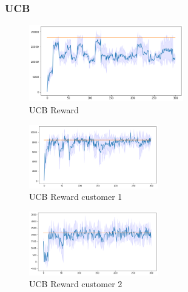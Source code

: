 \subsubsection{UCB}
\begin{figure}[ht]  
    \begin{center}
    \includegraphics[width=0.6\textwidth]{img/ucb7.png}
    \caption{UCB Reward}
    \label{fig:reward7}
    \end{center}
\end{figure}
\begin{multicols}{2}
    \begin{figure}[H]
        \begin{center}
        \includegraphics[width=0.5\textwidth]{img/ucb7_1.png}
        \caption{UCB Reward customer 1}
        \label{fig:reward71}
        \end{center}
    \end{figure}
    \columnbreak
    \begin{figure}[H]
        \begin{center}
        \includegraphics[width=0.5\textwidth]{img/ucb7_2.png}
        \caption{UCB Reward customer 2}
        \label{fig:reward72}
        \end{center}
    \end{figure}
\end{multicols}

